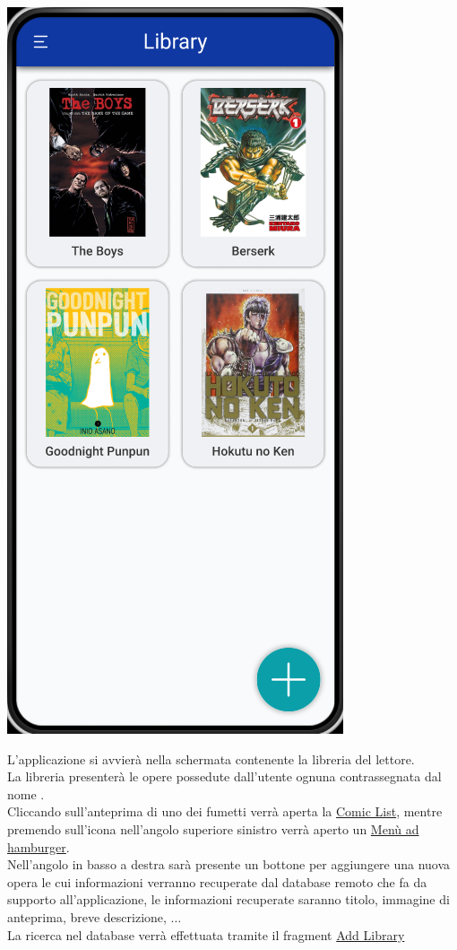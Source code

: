 \documentclass{report}
\begin{document}
\begin{center}
   \includegraphics[scale=0.4]{library_home_page.png}
\end{center}

L'applicazione si avvierà nella schermata contenente la libreria del lettore.\\
La libreria presenterà le opere possedute dall'utente ognuna contrassegnata dal nome .\\
Cliccando sull'anteprima di uno dei fumetti verrà aperta la \hyperref[sec:comic_list]{Comic List}, mentre premendo sull'icona nell'angolo superiore sinistro verrà aperto un \hyperref[sec:hamburger]{Menù ad hamburger}.\\
Nell'angolo in basso a destra sarà presente un bottone per aggiungere una nuova opera le cui informazioni verranno recuperate dal database remoto che fa da supporto all'applicazione, le informazioni recuperate saranno titolo, immagine di anteprima, breve descrizione, $\dots$\\
La ricerca nel database verrà effettuata tramite il fragment \hyperref[sec:add_library]{Add Library}
\end{document}

